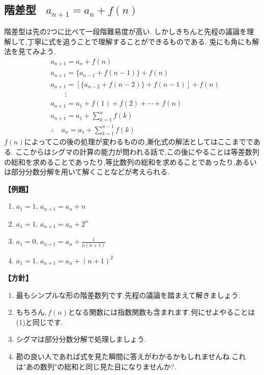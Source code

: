 
    \subsection{階差型 \, $a_{n+1}=a_n+f(n)$}
      階差型は先の2つに比べて一段階難易度が高い.
      しかしきちんと先程の議論を理解して,丁寧に式を追うことで理解することができるものである.
      兎にも角にも解法を見てみよう.
      \begin{align*}
        &a_{n+1}=a_n+f(n)\\
        &a_{n+1}=\{a_{n-1}+f(n-1)\}+f(n)\\
        &a_{n+1}=\left[\{a_{n-2}+f(n-2)\}+f(n-1)\right]+f(n)\\
        &\qquad \vdots\\
        &a_{n+1}=a_1+f(1)+f(2)+\cdots+f(n)\\
        &a_{n+1}=a_1+\sum_{k=1}^{n} f(k)\\
        &\therefore \quad a_n=a_1+\sum_{k=1}^{n-1} f(k)
      \end{align*}
      $f(n)$によってこの後の処理が変わるものの,漸化式の解法としてはここまでである.
      ここからはシグマの計算の能力が問われる話で,この後にやることは等差数列の総和を求めることであったり,等比数列の総和を求めることであったり,あるいは部分分数分解を用いて解くことなどが考えられる.

      \noindent \textbf{【例題】}
      \begin{enumerate}[label=(\arabic*),parsep=3pt]
        \item $\displaystyle a_1=1,\, a_{n+1}=a_n+n$
        \item $\displaystyle a_1=1,\, a_{n+1}=a_n+2^n$
        \item $\displaystyle a_1=0,\, a_{n+1}=a_n+\frac{1}{n(n+1)}$
        \item $\displaystyle a_1=1,\, a_{n+1}=a_n+(n+1)^2$
      \end{enumerate}

      \noindent\textbf{【方針】}
      \begin{enumerate}[label=(\arabic*),parsep=3pt]
        \item 最もシンプルな形の階差数列です.先程の議論を踏まえて解きましょう.
        \item もちろん,\,$f(n)$となる関数には指数関数も含まれます.何にせよやることは\,(1)と同じです.
        \item シグマは部分分数分解で処理しましょう.
        \item 勘の良い人であれば式を見た瞬間に答えがわかるかもしれませんね.これは"あの数列"の総和と同じ見た目になりませんか?.
      \end{enumerate}

